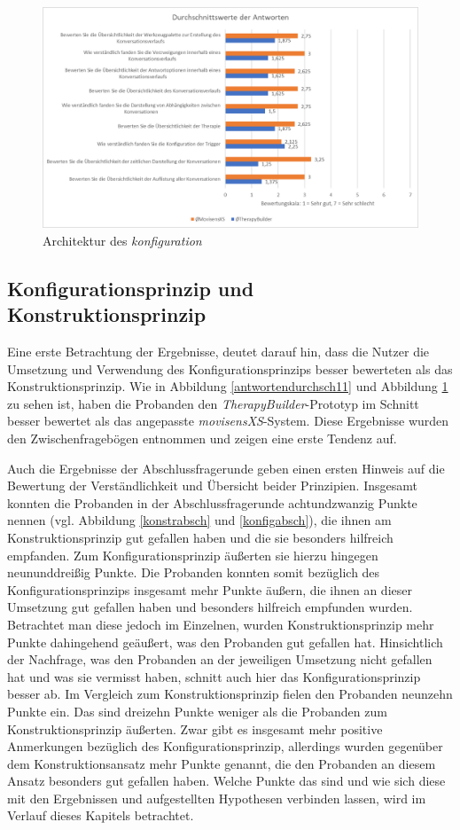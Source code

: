\begin{figure}[h]
\centering
\includegraphics[width=1\textwidth]{pictures/diagramme/antwortendurchsch2}
\caption{Architektur des \emph{konfiguration}}
\label{antwortendurchsch22}
\end{figure}


\subsection{Konfigurationsprinzip und Konstruktionsprinzip}
Eine erste Betrachtung der Ergebnisse, deutet darauf hin, dass die Nutzer die Umsetzung und Verwendung des Konfigurationsprinzips besser bewerteten als das Konstruktionsprinzip. Wie in Abbildung \ref{antwortendurchsch11} und Abbildung \ref{antwortendurchsch22} zu sehen ist, haben die Probanden den \emph{TherapyBuilder}-Prototyp im Schnitt besser bewertet als das angepasste \emph{movisensXS}-System. Diese Ergebnisse wurden den Zwischenfragebögen entnommen und zeigen eine erste Tendenz auf. 

Auch die Ergebnisse der Abschlussfragerunde geben einen ersten Hinweis auf die Bewertung der Verständlichkeit und Übersicht beider Prinzipien. Insgesamt konnten die Probanden in der Abschlussfragerunde achtundzwanzig Punkte nennen (vgl. Abbildung \ref{konstrabsch} und \ref{konfigabsch}), die ihnen am Konstruktionsprinzip gut gefallen haben und die sie besonders hilfreich empfanden. Zum Konfigurationsprinzip äußerten sie hierzu hingegen neununddreißig Punkte. Die Probanden konnten somit bezüglich des Konfigurationsprinzips insgesamt mehr Punkte äußern, die ihnen an dieser Umsetzung gut gefallen haben und besonders hilfreich empfunden wurden. Betrachtet man diese jedoch im Einzelnen, wurden Konstruktionsprinzip mehr Punkte dahingehend geäußert, was den Probanden gut gefallen hat. Hinsichtlich der Nachfrage, was den Probanden an der jeweiligen Umsetzung nicht gefallen hat und was sie vermisst haben, schnitt auch hier das Konfigurationsprinzip besser ab. Im Vergleich zum Konstruktionsprinzip fielen den Probanden neunzehn Punkte ein. Das sind dreizehn Punkte weniger als die Probanden zum Konstruktionsprinzip äußerten. Zwar gibt es insgesamt mehr positive Anmerkungen bezüglich des Konfigurationsprinzip, allerdings wurden gegenüber dem Konstruktionsansatz mehr Punkte genannt, die den Probanden an diesem Ansatz besonders gut gefallen haben. Welche Punkte das sind und wie sich diese mit den Ergebnissen und aufgestellten Hypothesen verbinden lassen, wird im Verlauf dieses Kapitels betrachtet.


